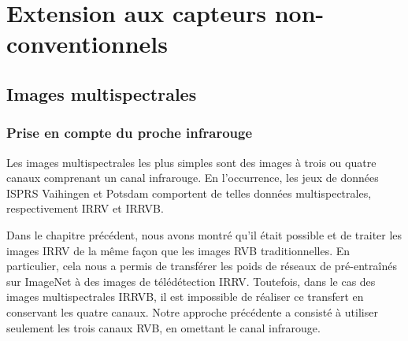 \chapter{Extension aux capteurs non-conventionnels}
\label{chap:extension}
\minitoc


\newpage

\section{Images multispectrales}

\subsection{Prise en compte du proche infrarouge}

Les images multispectrales les plus simples sont des images à trois ou quatre canaux comprenant un canal infrarouge. En l'occurrence, les jeux de données \gls{ISPRS} Vaihingen et Potsdam comportent de telles données multispectrales, respectivement \gls{IRRV} et \gls{IRRVB}.

Dans le chapitre précédent, nous avons montré qu'il était possible et de traiter les images \gls{IRRV} de la même façon que les images \gls{RVB} traditionnelles. En particulier, cela nous a permis de transférer les poids de réseaux de pré-entraînés sur ImageNet à des images de télédétection \gls{IRRV}. Toutefois, dans le cas des images multispectrales \gls{IRRVB}, il est impossible de réaliser ce transfert en conservant les quatre canaux. Notre approche précédente a consisté à utiliser seulement les trois canaux \gls{RVB}, en omettant le canal infrarouge.

